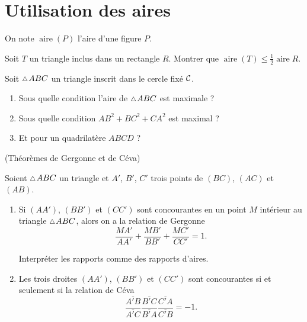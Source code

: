 \documentclass[a4paper,11pt,reqno]{amsart}
\DeclareMathOperator{\aire}{aire}
\begin{document}
\section{Utilisation des aires}

\begin{convention}
  On note $\aire (P)$ l'aire d'une figure $P$.
\end{convention}

\begin{exo}[.5]

  Soit $T$ un triangle inclus dans un rectangle $R$. Montrer que $\aire(T) \leqslant \frac{1}{2}\aire{R}$.
\end{exo}

\begin{exo}
  Soit $\tri ABC$ un triangle inscrit dans le cercle fixé $\mathcal{C}$.
  \begin{enumerate}
    \item Sous quelle condition l'aire de $\tri ABC$ est maximale ?
    \item Sous quelle condition $AB^{2}+BC^{2}+CA^{2}$ est maximal ?
    \item Et pour un quadrilatère $ABCD$ ?
  \end{enumerate}

\end{exo}

\begin{exo} (Théorèmes de Gergonne et de Céva)

  Soient $\tri ABC$ un triangle et $A'$, $B'$, $C'$ trois points de $(BC)$, $(AC)$ et $(AB)$.
  \begin{enumerate}
    \item Si $(AA')$, $(BB')$ et $(CC')$ sont concourantes en un point $M$ intérieur au triangle $\tri ABC$, alors on a la relation de Gergonne
    $$
      \frac{MA'}{AA'}+\frac{MB'}{BB'}+\frac{MC'}{CC'}=1.
    $$
    \begin{indication}
      Interpréter les rapports comme des rapports d'aires.
    \end{indication}
    \item Les trois droites $(AA')$, $(BB')$ et $(CC')$ sont concourantes si et seulement si la relation de Céva
      $$
        \frac{\overline{A'B}}{\overline{A'C}}\frac{\overline{B'C}}{\overline{B'A}}\frac{\overline{C'A}}{\overline{C'B}}=-1.
      $$
  \end{enumerate}
\end{exo}
\end{document}
